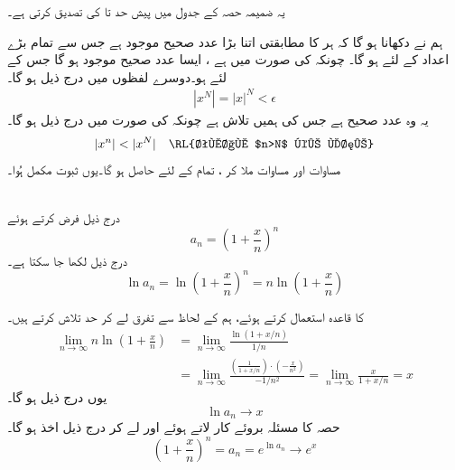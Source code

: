 

یہ ضمیمہ  حصہ    کے  جدول     میں پیش   حد   تا  کی تصدیق کرتی ہے۔

\quad {}\quad 
ہم نے دکھانا ہو گا کہ   ہر  کا   مطابقتی    اتنا بڑا عدد صحیح  موجود ہے  جس سے  تمام   بڑے اعداد  کے
 لئے  ہو گا۔ چونکہ   کی صورت میں  ہے ، ایسا عدد صحیح موجود ہو گا جس کے لئے  ہو۔دوسرے لفظوں  میں درج ذیل ہو گا۔
\begin{align}\label{مساوات_ضمیمہ_ج_ایک}
|x^N|=|x|^N<\epsilon
\end{align}
یہ وہ عدد صحیح ہے جس کی ہمیں تلاش ہے چونکہ  کی صورت میں درج ذیل ہو گا۔
\begin{align}\label{مساوات_ضمیمہ_ج_دو}
|x^n|<|x^N|\quad \text{\RL{تمام $n>N$ کے لئے}}
\end{align}
مساوات  اور مساوات  ملا کر ، تمام  کے 
لئے    حاصل ہو گا۔یوں ثبوت مکمل ہُوا۔

 \quad
  \\
 درج ذیل فرض کرتے ہوئے
\[a_n=\left(1+\frac{x}{n}\right)^n\]
درج ذیل لکھا جا سکتا ہے۔
\[\ln a_n=\ln \left(1+\frac{x}{n}\right)^n=n\ln\left(1+\frac{x}{n}\right)\]

  کا قاعدہ  استعمال کرتے ہوئے،  ہم  کے لحاظ سے تفرق لے کر حد تلاش کرتے ہیں۔
\begin{align*}
\lim_{n\to\infty} n\ln \left(1+\frac{x}{n}\right) &=\lim_{n\to\infty}\frac{\ln (1+x\!/\!n)}{1\!/\!n}\\
&=\lim_{n\to\infty}\frac{\left(\frac{1}{1+x\!/\!n}\right)\cdot\left(-\frac{x}{n^2}\right)}{-1\!/\!n^2}=\lim_{n\to\infty}\frac{x}{1+x\!/\!n}=x
\end{align*}
یوں درج ذیل ہو گا۔
\[\ln a_n\to x\]
حصہ  کا مسئلہ  بروئے کار لاتے ہوئے اور  لے کر درج ذیل اخذ ہو گا۔
\[\left(1+\frac{x}{n}\right)^n=a_n=e^{\ln a_n}\to e^x\]

